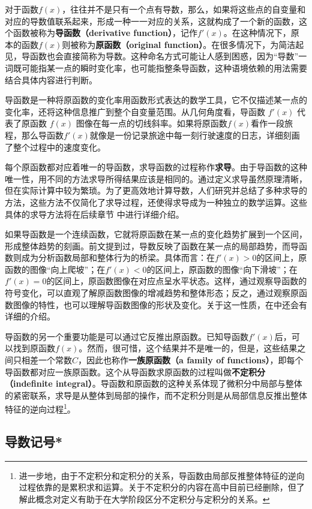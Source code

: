 对于函数$f(x)$，往往并不是只有一个点有导数，那么，如果将这些点的自变量和对应的导数值联系起来，形成一种一一对应的关系，这就构成了一个新的函数，这个函数被称为\textbf{导函数（derivative function）}，记作$f'(x)$。在这种情况下，原本的函数$f(x)$则被称为\textbf{原函数（original function）}。在很多情况下，为简洁起见，导函数也会直接简称为导数。这种命名方式可能让人感到困惑，因为“导数”一词既可能指某一点的瞬时变化率，也可能指整条导函数，这种语境依赖的用法需要结合具体内容进行判断。

导函数是一种将原函数的变化率用函数形式表达的数学工具，它不仅描述某一点的变化率，还将这种信息推广到整个自变量范围。从几何角度看，导函数  $f'(x)$  代表了原函数  $f(x)$  图像在每一点的切线斜率。如果将原函数$f(x)$看作一段旅程，那么导函数$f'(x)$就像是一份记录旅途中每一刻行驶速度的日志，详细刻画了整个过程中的速度变化。

每个原函数都对应着唯一的导函数，求导函数的过程称作\textbf{求导}。由于导函数的这种唯一性，用不同的方法求导所得结果应该是相同的。通过定义求导虽然原理清晰，但在实际计算中较为繁琐。为了更高效地计算导数，人们研究并总结了多种求导的方法，这些方法不仅简化了求导过程，还使得求导成为一种独立的数学运算。这些具体的求导方法将在后续章节  中进行详细介绍。

如果导函数是一个连续函数，它就将原函数在某一点的变化趋势扩展到一个区间，形成整体趋势的刻画。前文提到过，导数反映了函数在某一点的局部趋势，而导函数则成为分析函数局部和整体行为的桥梁。具体而言：在$f'(x) > 0$的区间上，原函数的图像“向上爬坡”；在$f'(x) < 0$的区间上，原函数的图像“向下滑坡”；在$f'(x) = 0$的区间上，原函数图像在对应点呈水平状态。这样，通过观察导函数的符号变化，可以直观了解原函数图像的增减趋势和整体形态；反之，通过观察原函数图像的特性，也可以理解导函数图像的形状及变化。关于这一性质，在中还会有详细的介绍。

导函数的另一个重要功能是可以通过它反推出原函数。已知导函数$f'(x)$后，可以找到原函数$f(x)$。然而，很可惜，这个结果并不是唯一的，但是，这些结果之间只相差一个常数$C$，因此也称作\textbf{一族原函数（a family of functions）}，即每个导函数都对应一族原函数。这个从导函数求原函数的过程叫做\textbf{不定积分（indefinite integral）}。导函数和原函数的这种关系体现了微积分中局部与整体的紧密联系，求导是从整体到局部的操作，而不定积分则是从局部信息反推出整体特征的逆向过程\footnote{进一步地，由于不定积分和定积分的关系，导函数由局部反推整体特征的逆向过程依靠的是累积求和运算。关于不定积分的内容在高中目前已经删除，但了解此概念对定义有助于在大学阶段区分不定积分与定积分的关系。}。

\subsection{导数记号*}

